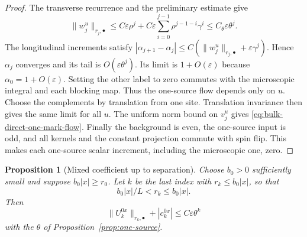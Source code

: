 \documentclass[11pt]{article}
\newtheorem{proposition}{Proposition}[section]
\theoremstyle{definition}
\begin{document}
\begin{proof}
The transverse recurrence and the preliminary estimate give
\[
 \|w_j^u\|_{r_j,\bullet}
 \le C\varepsilon\rho^j+
     C\varepsilon\sum_{i=0}^{j-1}\rho^{j-1-i}\gamma^i
 \le C_\theta\varepsilon\theta^j.
\]
The longitudinal increments satisfy
\(|\alpha_{j+1}-\alpha_j|\le
C(\|w_j^u\|_{r_j,\bullet}+\varepsilon\gamma^j)\).
Hence \(\alpha_j\) converges and its tail is
\(O(\varepsilon\theta^j)\). Its limit is \(1+O(\varepsilon)\)
because \(\alpha_0=1+O(\varepsilon)\).
Setting the other label to zero commutes with the microscopic
integral and each blocking map. Thus the one-source flow depends
only on \(u\). Choose the complements by translation from one
site. Translation invariance then gives the same limit for
all \(u\). The uniform norm bound on \(v_j^u\) gives
\eqref{eq:bulk-direct-one-mark-flow}. Finally the background is
even, the one-source input is odd, and all kernels and the
constant projection commute with spin flip. This makes each
one-source scalar increment, including the microscopic one, zero.
\end{proof}

\begin{proposition}[Mixed coefficient up to separation]
\label{prop:mixed-source}
Choose \(b_0>0\) sufficiently small and suppose
\(b_0|x|\ge r_0\). Let \(k\) be the last index with
\(r_k\le b_0|x|\), so that
\begin{equation}
 b_0|x|/L<r_k\le b_0|x|.
 \label{eq:separation-scale}
\end{equation}
Then
\begin{equation}
 \|U_k^{0x}\|_{r_k,\bullet}+|c_k^{0x}|
 \le C\varepsilon\theta^k
 \label{eq:mixed-bound}
\end{equation}
with the \(\theta\) of Proposition~\ref{prop:one-source}.
\end{proposition}
\end{document}
